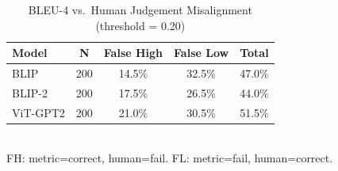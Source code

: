 
\begin{table}[!t]
\renewcommand{\arraystretch}{1.2}
\caption{BLEU-4 vs.\ Human Judgement Misalignment (threshold = 0.20)}
\label{tab:misalignment}
\centering
\begin{tabular}{lcccc}
\hline
\textbf{Model} & \textbf{N} & \textbf{False High} & \textbf{False Low} & \textbf{Total} \\
\hline
BLIP & 200 & 14.5\% & 32.5\% & 47.0\% \\
BLIP-2 & 200 & 17.5\% & 26.5\% & 44.0\% \\
ViT-GPT2 & 200 & 21.0\% & 30.5\% & 51.5\% \\
\hline
\end{tabular}
\\
\small FH: metric=correct, human=fail. FL: metric=fail, human=correct.
\end{table}
